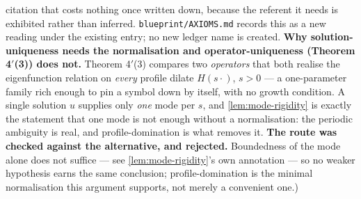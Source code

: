 \begin{corollary}
{citation that costs nothing once written down, because the referent it needs is
exhibited rather than inferred. \texttt{blueprint/AXIOMS.md} records this as a new reading under
the existing entry; no new ledger name is created.
\textbf{Why solution-uniqueness needs the normalisation and operator-uniqueness (Theorem 4$'$(3))
does not.} Theorem 4$'$(3) compares two \emph{operators} that both realise the eigenfunction
relation on \emph{every} profile dilate $H(s\cdot)$, $s>0$ --- a one-parameter family rich enough to
pin a symbol down by itself, with no growth condition. A single solution $u$ supplies only \emph{one}
mode per $s$, and \ref{lem:mode-rigidity} is exactly the statement that one mode is not enough
without a normalisation: the periodic ambiguity is real, and profile-domination is what removes it.
\textbf{The route was checked against the alternative, and rejected.} Boundedness of the mode alone
does not suffice --- see \ref{lem:mode-rigidity}'s own annotation --- so no weaker hypothesis earns
the same conclusion; profile-domination is the minimal normalisation this argument supports, not
merely a convenient one.)}
\end{corollary}

